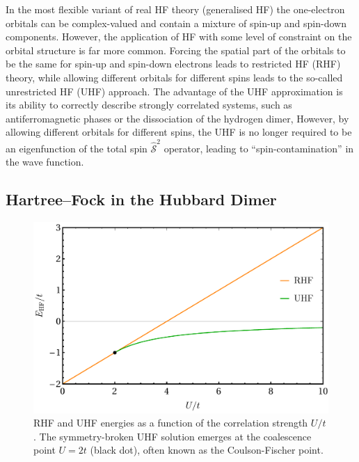 \documentclass[aps,prb,reprint,noshowkeys,linenumbers,superscriptaddress]{revtex4-1}
\begin{document}
In the most flexible variant of real HF theory (generalised HF) the one-electron orbitals can be complex-valued
and contain a mixture of spin-up and spin-down components.\cite{Mayer_1993,Jimenez-Hoyos_2011}
However, the application of HF with some level of constraint on the orbital structure is far more common.
Forcing the spatial part of the orbitals to be the same for spin-up and spin-down electrons leads to restricted HF (RHF) theory, 
while allowing different orbitals for different spins leads to the so-called unrestricted HF (UHF) approach.\cite{StuberPaldus}
The advantage of the UHF approximation is its ability to correctly describe strongly correlated systems, 
such as antiferromagnetic phases\cite{Slater_1951} or the dissociation of the hydrogen dimer,\cite{Coulson_1949}
However, by allowing different orbitals for different spins, the UHF is no longer required to be an eigenfunction of 
the total spin $\hat{\mathcal{S}}^2$ operator, leading to ``spin-contamination'' in the wave function.

\subsection{Hartree--Fock in the Hubbard Dimer}
\label{sec:HF_hubbard}

\begin{figure}
    \includegraphics[width=\linewidth]{HF_real.pdf}
    \caption{\label{fig:HF_real}
    RHF and UHF energies as a function of the correlation strength $U/t$. 
    The symmetry-broken UHF solution emerges at the coalescence point $U=2t$ (black dot), often known as the Coulson-Fischer point.}
\end{figure}
\end{document}
